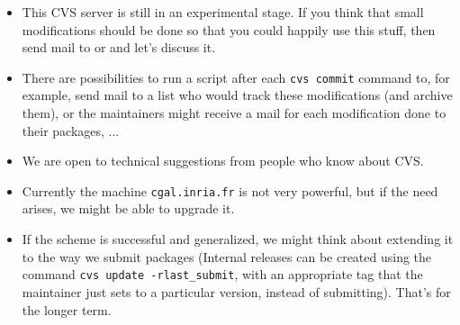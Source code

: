 \begin{itemize}
\item
     This CVS server is still in an experimental stage.  If you think
     that small modifications should be done so that you could happily use
     this stuff, then send mail to 
     or 
     and let's discuss it.
\item
     There are possibilities to run a script after each \texttt{cvs
     commit} command to, for example, send mail to a list who would track
     these modifications (and archive them), or the maintainers might receive
     a mail for each modification done to their packages, \etc...
\item
     We are open to technical suggestions from people who know about CVS.
\item
     Currently the machine \texttt{cgal.inria.fr} is not very powerful,
     but if the need arises, we might be able to upgrade it.
\item
     If the scheme is successful and generalized, we might think about
     extending it to the way we submit packages (Internal releases
     can be created using the command \texttt{cvs update -rlast\_submit}, 
     with an appropriate tag that the
     maintainer just sets to a particular version, instead of submitting).
     That's for the longer term.
\end{itemize}

